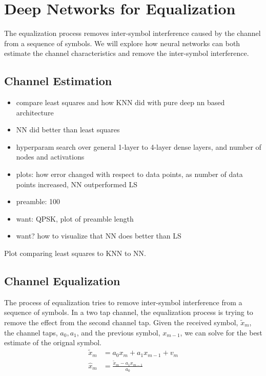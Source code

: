 \chapter{Deep Networks for Equalization}

The equalization process removes inter-symbol interference caused by the channel from a sequence of symbols.  We will explore how neural networks can both estimate the channel characteristics and remove the inter-symbol interference.

\section{Channel Estimation}

\begin{itemize}
\item compare least squares and how KNN did with pure deep nn based architecture
\item NN did better than least squares
\item hyperparam search over general 1-layer to 4-layer dense layers, and number of nodes and activations
\item plots: how error changed with respect to data points, as number of data points increased, NN outperformed LS
\item preamble: 100
\item want: QPSK, plot of preamble length
\item want? how to visualize that NN does better than LS
\end{itemize}

Plot comparing least squares to KNN to NN.



\section{Channel Equalization}

The process of equalization tries to remove inter-symbol interference from a sequence of symbols.  
In a two tap channel, the equalization process is trying to remove the effect from the second channel tap.  Given the received symbol, $\tilde{x}_m$, the channel taps, $a_0, a_1$, and the previous symbol, $x_{m-1}$, we can solve for the best estimate of the orignal symbol.
\begin{align}
\tilde{x}_m &= a_0 x_{m} + a_1 x_{m-1} + v_m\\
\hat{x}_m &= \frac{\tilde{x}_m - a_1 x_{m-1}}{a_0}
\end{align}

